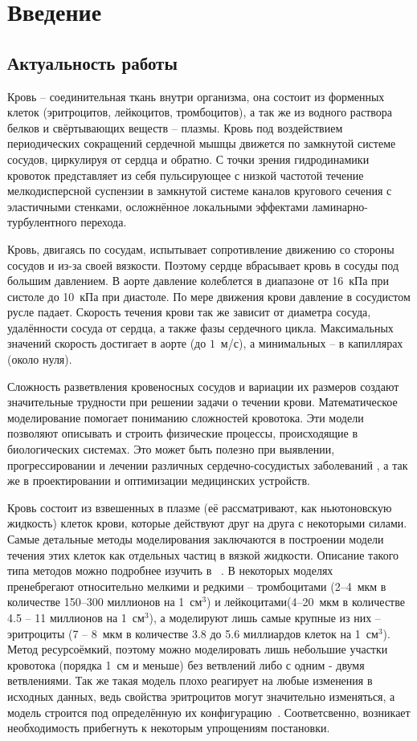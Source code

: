 \section{Введение}
\subsection{Актуальность работы}

Кровь -- соединительная ткань внутри организма, она состоит из форменных клеток (эритроцитов, лейкоцитов, тромбоцитов), а так же из
водного раствора белков и свёртывающих веществ -- плазмы. Кровь под воздействием периодических сокращений сердечной мышцы 
движется по замкнутой системе сосудов, циркулируя от сердца и обратно. С точки зрения гидродинамики кровоток представляет 
из себя пульсирующее с низкой частотой течение мелкодисперсной суспензии в 
замкнутой системе каналов кругового сечения с эластичными стенками, осложнённое локальными эффектами ламинарно-турбулентного перехода.

Кровь, двигаясь по сосудам, испытывает сопротивление движению со стороны сосудов и из-за своей вязкости. Поэтому сердце вбрасывает 
кровь в сосуды под большим давлением. В аорте давление колеблется в диапазоне от 16~кПа при систоле до 10~кПа при диастоле. 
По мере движения крови давление в сосудистом русле падает. 
Скорость течения крови так же зависит от диаметра сосуда, удалённости сосуда от сердца, а также фазы сердечного цикла. 
Максимальных значений скорость достигает в аорте (до \texttilde$1$~м/с), а минимальных -- в капиллярах (около нуля).

Сложность разветвления кровеносных сосудов и вариации их размеров создают значительные трудности при решении задачи о течении крови. 
Математическое моделирование помогает  
пониманию сложностей кровотока. Эти модели позволяют описывать и строить физические процессы, происходящие 
в биологических системах. Это может быть полезно при выявлении, прогрессировании и лечении  различных сердечно-сосудистых заболеваний , 
а так же в проектировании и оптимизации медицинских устройств.

Кровь состоит из взвешенных в плазме 
(её рассматривают, как ньютоновскую жидкость) клеток крови, которые действуют друг на друга с некоторыми силами. 
Самые детальные методы моделирования заключаются в построении модели течения этих клеток как отдельных частиц в вязкой жидкости.
Описание такого типа методов можно подробнее изучить в ~\cite{Fedosov:2010,Fedosov:2008,Mehboudi:2001}. 
В некоторых моделях ~\cite{bessonov:2014,hosseini:2009} пренебрегают относительно мелкими и редкими -- тромбоцитами
(2--4~мкм в количестве 150--300 миллионов на 1~см$^3$) и лейкоцитами(4--20~мкм в количестве 4.5 -- 11 миллионов на 1~см$^3$), 
а моделируют лишь самые крупные из них -- эритроциты (7 -- 8~мкм в количестве 3.8 до 5.6 миллиардов клеток на 1~см$^3$).
Метод ресурсоёмкий, поэтому можно моделировать лишь небольшие участки кровотока (порядка 1~см и меньше) без ветвлений 
либо с одним - двумя ветвлениями.
Так же такая модель плохо реагирует на любые изменения в исходных данных, ведь свойства эритроцитов могут значительно изменяться, 
а модель строится под определённую их конфигурацию~\cite{Yamaguchi2010}. 
Соответсвенно, возникает необходимость прибегнуть к некоторым упрощениям постановки.


